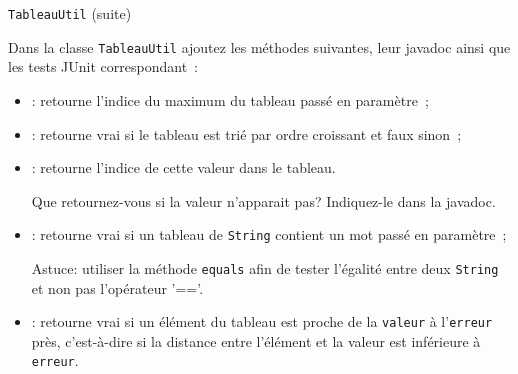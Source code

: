 \documentclass[a4paper,11pt]{style-esi/td}
\begin{document}
	\begin{Exercice}{\texttt{TableauUtil} (suite)}	

		Dans la classe \texttt{TableauUtil} ajoutez les méthodes suivantes, leur javadoc ainsi que les tests JUnit correspondant~:
	\begin{itemize}
		\item {}: 
				retourne l'indice du maximum du tableau passé en paramètre~;
		\item {}: 
				retourne vrai si le tableau est trié par ordre croissant et 	
				faux sinon~;
		\item {}: 
				retourne l'indice de cette valeur dans le tableau. 
				
				Que retournez-vous si la valeur n'apparait pas?
				Indiquez-le dans la javadoc.
		\item  {}: 
			retourne vrai si un tableau de \texttt{String} contient un mot passé en
			paramètre~;
			
			Astuce: utiliser la méthode \texttt{equals} afin de tester 
			l'égalité entre deux \texttt{String} et non pas l'opérateur '=='.
		\item  {}: 
			retourne vrai si un élément du tableau est proche de la \texttt{valeur}
			à l'\texttt{erreur} près, c'est-à-dire si la distance entre l'élément 
			et la valeur est inférieure à \texttt{erreur}.
%	
	\end{itemize}
	\end{Exercice}
	
\end{document}
